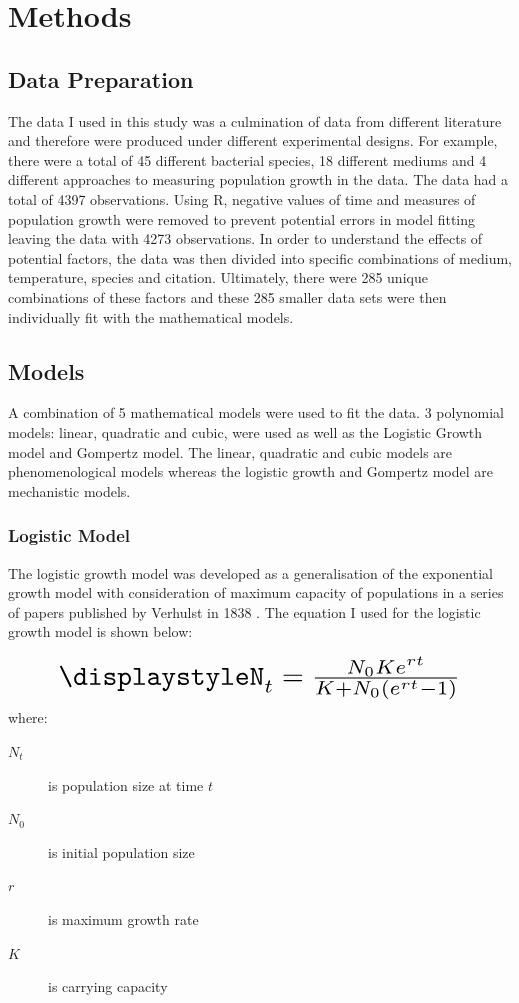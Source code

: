 \documentclass[11pt]{article}
\begin{document}
    \section{Methods}
    \subsection{Data Preparation}
    The data I used in this study was a culmination of data from  different literature and therefore  were produced under different experimental designs. For example, there were a total of 45 different bacterial species, 18 different mediums and 4 different approaches to measuring population growth in the data.  The data had a total of 4397 observations. Using R, negative values of time and measures of population growth were removed to prevent potential errors in model fitting leaving the data with 4273 observations. In order to understand the effects of potential factors, the data was then divided into specific combinations of medium, temperature, species and citation. Ultimately, there were 285 unique combinations of these factors and these 285 smaller data sets were then individually fit with the mathematical models.
    
    \subsection{Models}
    A combination of 5 mathematical models were used to fit the data. 3 polynomial models: linear, quadratic and cubic, were used as well as the Logistic Growth model and Gompertz model. The linear, quadratic and cubic models are phenomenological models whereas the logistic growth and Gompertz model are mechanistic models. 
    
    \subsubsection{Logistic Model}
    The logistic growth model was developed as a generalisation of the exponential growth model with consideration of maximum capacity of populations in a series of papers published by Verhulst in 1838 \citep{bacaer2011verhulst}. The equation I used for the logistic growth model is shown below:
    
    \[ \scalebox{2}{$\displaystyleN_t = \frac{N_0Ke^{rt}}{K + N_0(e^{rt}-1)}$} \]
    where:
    \begin{description}
    \item[$N_{t}$] is population size at time $t$
    \item[$N_{0}$] is initial population size
    \item[$r$] is maximum growth rate
    \item[$K$] is carrying capacity
    \end{description}
    
\end{document}
